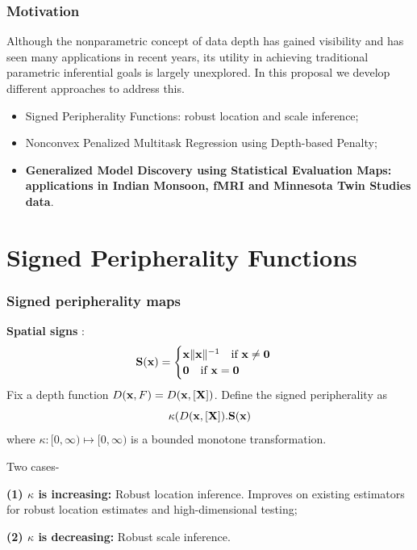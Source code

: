 \documentclass[handout,10pt]{beamer}
\begin{document}
\begin{frame}
\frametitle{Motivation}
Although the nonparametric concept of data depth has gained visibility and has seen many applications in recent years, its utility in achieving traditional parametric inferential goals is largely unexplored. In this proposal we develop different approaches to address this.

\vspace{1em}
\begin{itemize}
\item Signed Peripherality Functions: robust location and scale inference;
\vspace{.5em}

\item Nonconvex Penalized Multitask Regression using Depth-based Penalty;
\vspace{.5em}

\item \textbf{Generalized Model Discovery using Statistical Evaluation Maps: applications in Indian Monsoon, fMRI and Minnesota Twin Studies data}.
\end{itemize}
\end{frame}


\section{Signed Peripherality Functions}


\begin{frame}
\frametitle{Signed peripherality maps}

\textbf{Spatial signs} \citep{locantore99}:
%
$$ {\mathbf{S}}({\bf{x}}) = \begin{cases} {\bf{x}}\| {\bf{x}} \|^{-1} \quad \mbox{if }{\bf{x}} \neq \bf0\\
\bf0 \quad \mbox{if }{\bf{x}} = \bf0 \end{cases} $$
%
\vspace{1em}
Fix a depth function $D({\bf{x}}, F) = D ({\bf{x}}, [{\mathbf{X}}])$. Define the signed peripherality as
%
$$ \kappa (D ({\bf{x}}, [ {\mathbf{X}}]). {\mathbf{S}} ({\bf{x}}) $$
%
where $\kappa: [0, \infty) \mapsto [0, \infty)$ is a bounded monotone transformation.

\vspace{1em}
Two cases-

\vspace{1em}
\textbf{(1) $\kappa$ is increasing:} Robust location inference. Improves on existing estimators for robust location estimates and high-dimensional testing;

\vspace{1em}
\textbf{(2) $\kappa$ is decreasing:}  Robust scale inference.

\end{frame}
\end{document}
